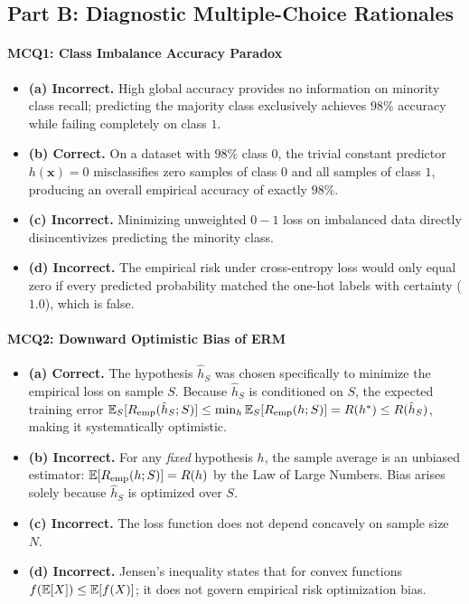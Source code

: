 \subsection*{Part B: Diagnostic Multiple-Choice Rationales}

\paragraph{MCQ1: Class Imbalance Accuracy Paradox}
\begin{itemize}
    \item \textbf{(a) Incorrect.} High global accuracy provides no information on minority class recall; predicting the majority class exclusively achieves $98\%$ accuracy while failing completely on class $1$.
    \item \textbf{(b) Correct.} On a dataset with $98\%$ class $0$, the trivial constant predictor $h(\mathbf{x}) = 0$ misclassifies zero samples of class $0$ and all samples of class $1$, producing an overall empirical accuracy of exactly $98\%$.
    \item \textbf{(c) Incorrect.} Minimizing unweighted $0-1$ loss on imbalanced data directly disincentivizes predicting the minority class.
    \item \textbf{(d) Incorrect.} The empirical risk under cross-entropy loss would only equal zero if every predicted probability matched the one-hot labels with certainty ($1.0$), which is false.
\end{itemize}

\paragraph{MCQ2: Downward Optimistic Bias of ERM}
\begin{itemize}
    \item \textbf{(a) Correct.} The hypothesis $\hat{h}_S$ was chosen specifically to minimize the empirical loss on sample $S$. Because $\hat{h}_S$ is conditioned on $S$, the expected training error $\operatorname{\mathbb{E}}_S[R_{\text{emp}}(\hat{h}_S; S)] \le \min_h \operatorname{\mathbb{E}}_S[R_{\text{emp}}(h; S)] = R(h^*) \le R(\hat{h}_S)$, making it systematically optimistic.
    \item \textbf{(b) Incorrect.} For any \emph{fixed} hypothesis $h$, the sample average is an unbiased estimator: $\operatorname{\mathbb{E}}[R_{\text{emp}}(h; S)] = R(h)$ by the Law of Large Numbers. Bias arises solely because $\hat{h}_S$ is optimized over $S$.
    \item \textbf{(c) Incorrect.} The loss function does not depend concavely on sample size $N$.
    \item \textbf{(d) Incorrect.} Jensen's inequality states that for convex functions $f(\operatorname{\mathbb{E}}[X]) \le \operatorname{\mathbb{E}}[f(X)]$; it does not govern empirical risk optimization bias.
\end{itemize}

